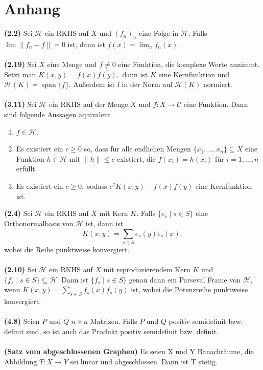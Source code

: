 \documentclass[12pt,titlepage,twoside,cleardoublepage]{article}
\theoremstyle{nummermitklammern}
\numberwithin{equation}{section}
\DeclareMathOperator{\Span}{span}
\begin{document}
 \section*{Anhang}
 \textbf{(2.2)} Sei $\mathcal{H}$ ein RKHS auf $X$ und $(f_n)_n$ eine Folge in $\mathcal{H}$. Falls $\lim \|f_n-f\|=0$ ist, dann ist $f(x)=\lim_n f_n(x).$\\\\
 \textbf{(2.19)} Sei $X$ eine Menge und $f\neq 0$ eine Funktion, die komplexe Werte annimmt. Setzt man $K(x,y)=f(x)\overline{f(y)} ,$ dann ist $K$ eine Kernfunktion und $\mathcal{H}(K)=\Span\{f\}.$ Außerdem ist f in der Norm auf $\mathcal{H}(K)$ normiert. \\\\
 \textbf{(3.11)} Sei $\mathcal{H}$ ein RKHS auf der Menge $X$ und $f:X\to \mathcal{C}$ eine Funktion. Dann sind folgende Aussagen äquivalent 
 \begin{enumerate}
 \item $f\in \mathcal{H}$;
 \item Es existiert ein $c\geq 0$ so, dass für alle endlichen Mengen $\{x_1,\ldots,x_n\}\subseteq X$ eine Funktion $h\in \mathcal{H}$ mit   $\|h\|\leq c$ existiert, die $f(x_i)=h(x_i)$ für $i=1,\ldots,n$ erfüllt.
 \item Es existiert ein $c\geq 0,$ sodass $c^2K(x,y)-f(x)\overline{f(y)}$ eine Kernfunktion ist.
 \end{enumerate}
\textbf{(2.4)} Sei $\mathcal{H}$ ein RKHS auf $X$ mit Kern $K.$ Falls $\{e_s\mid s\in S\}$ eine Orthonormalbasis von $\mathcal{H}$ ist, dann ist 
\[
K(x,y)=\sum_{s\in S}\overline{e_s(y)}e_s(x),
\]
wobei die Reihe punktweise konvergiert.\\\\
\textbf{(2.10)} Sei $\mathcal{H}$ ein RKHS auf $X$ mit reproduzierendem Kern $K$ und $\{f_s\mid s\in S\}\subseteq \mathcal{H}.$ Dann ist $\{f_s\mid s\in S\}$  genau dann ein Parseval Frame von $\mathcal{H},$ wenn $K(x,y)=\sum_{s\in S}f_s(x)\overline{f_s(y)}$ ist, wobei die Potenzreihe punktweise konvergiert.\\\\
\textbf{(4.8)} Seien $P$ und $Q$ $n\times n$ Matrizen. Falls $P$ und $Q$ positiv semidefinit bzw. definit sind, so ist auch das Produkt positiv semidefinit bzw. definit.\\\\
\textbf{(Satz vom abgeschlossenen Graphen)}
Es seien X und Y Banachräume, die Abbildung $T: X \to Y$ sei linear und abgeschlossen. Dann ist T stetig.
\newpage




 
\end{document}
